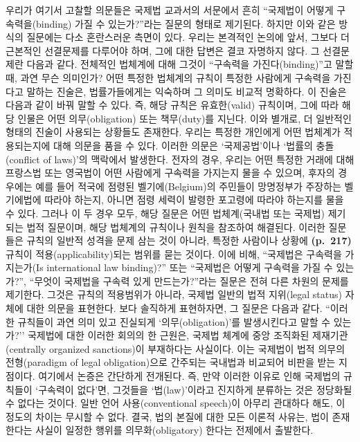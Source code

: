우리가 여기서 고찰할 의문들은 국제법 교과서의 서문에서 흔히 ``국제법이
어떻게 구속력을(binding) 가질 수 있는가?''라는 질문의 형태로 제기된다.
하지만 이와 같은 방식의 질문에는 다소 혼란스러운 측면이 있다. 우리는
본격적인 논의에 앞서, 그보다 더 근본적인 선결문제를 다루어야 하며, 그에
대한 답변은 결코 자명하지 않다. 그 선결문제란 다음과 같다. 전체적인
법체계에 대해 그것이 ``구속력을 가진다(binding)''고 말할 때, 과연 무슨
의미인가? 어떤 특정한 법체계의 규칙이 특정한 사람에게 구속력을 가진다고
말하는 진술은, 법률가들에게는 익숙하며 그 의미도 비교적 명확하다. 이
진술은 다음과 같이 바꿔 말할 수 있다. 즉, 해당 규칙은 유효한(valid)
규칙이며, 그에 따라 해당 인물은 어떤 의무(obligation) 또는 책무(duty)를
지닌다. 이와 별개로, 더 일반적인 형태의 진술이 사용되는 상황들도
존재한다. 우리는 특정한 개인에게 어떤 법체계가 적용되는지에 대해 의문을
품을 수 있다. 이러한 의문은 `국제공법'이나 `법률의 충돌(conflict of
laws)'의 맥락에서 발생한다. 전자의 경우, 우리는 어떤 특정한 거래에 대해
프랑스법 또는 영국법이 어떤 사람에게 구속력을 가지는지 물을 수 있으며,
후자의 경우에는 예를 들어 적국에 점령된 벨기에(Belgium)의 주민들이
망명정부가 주장하는 벨기에법에 따라야 하는지, 아니면 점령 세력이 발령한
포고령에 따라야 하는지를 물을 수 있다. 그러나 이 두 경우 모두, 해당
질문은 어떤 법체계(국내법 또는 국제법)  제기되는
법적 질문이며, 해당 법체계의 규칙이나 원칙을 참조하여 해결된다. 이러한
질문들은 규칙의 일반적 성격을 문제 삼는 것이 아니라, 특정한 사람이나
상황에 \textbf{(p.~217)} 규칙이 적용(applicability)되는 범위를 묻는
것이다. 이에 비해, ``국제법은 구속력을 가지는가(Is international law
binding)?'' 또는 ``국제법은 어떻게 구속력을 가질 수 있는가?'', ``무엇이
국제법을 구속력 있게 만드는가?''라는 질문은 전혀 다른 차원의 문제를
제기한다. 그것은 규칙의 적용범위가 아니라, 국제법 일반의 법적 지위(legal
status) 자체에 대한 의문을 표현한다. 보다 솔직하게 표현하자면, 그 질문은
다음과 같다. ``이러한 규칙들이 과연 의미 있고 진실되게
`의무(obligation)'를 발생시킨다고 말할 수 있는가?'' 국제법에 대한 이러한
회의의 한 근원은, 국제법 체계에 중앙 조직화된 제재기관(centrally
organized sanctions)이 부재하다는 사실이다. 이는 국제법이 법적 의무의
전형(paradigm of legal obligation)으로 간주되는 국내법과 비교되어 비판을
받는 지점이다. 여기에서 논증은 간단하게 전개된다. 즉, 만약 이러한 이유로
인해 국제법의 규칙들이 `구속력이 없다'면, 그것들을 `법(law)'이라고
진지하게 분류하는 것은 정당화될 수 없다는 것이다. 일반 언어
사용(conventional speech)이 아무리 관대하다 해도, 이 정도의 차이는
무시할 수 없다. 결국, 법의 본질에 대한 모든 이론적 사유는, 법이
존재한다는 사실이 일정한 행위를 의무화(obligatory) 한다는 전제에서
출발한다.

